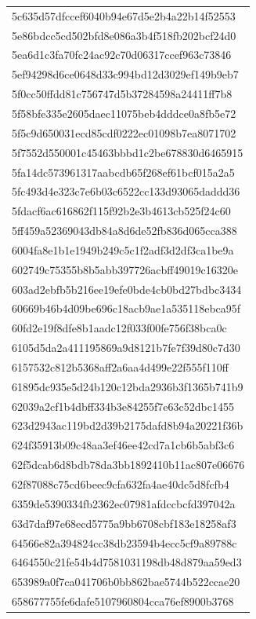 \begin{tabular}{l}
5c635d57dfccef6040b94e67d5e2b4a22b14f52553 \\
5e86bdcc5cd502bfd8e086a3b4f518fb202bcf24d0 \\
5ea6d1c3fa70fc24ac92c70d06317ccef963c73846 \\
5ef94298d6ce0648d33c994bd12d3029ef149b9eb7 \\
5f0cc50ffdd81c756747d5b37284598a24411ff7b8 \\
5f58bfe335e2605daec11075beb4dddce0a8fb5e72 \\
5f5c9d650031ecd85cdf0222ec01098b7ea8071702 \\
5f7552d550001c45463bbbd1c2be678830d6465915 \\
5fa14dc573961317aabcdb65f268ef61bcf015a2a5 \\
5fc493d4e323c7e6b03c6522cc133d93065daddd36 \\
5fdacf6ac616862f115f92b2e3b4613cb525f24c60 \\
5ff459a52369043db84a8d6de52fb836d065cca388 \\
6004fa8e1b1e1949b249c5c1f2adf3d2df3ca1be9a \\
602749c75355b8b5abb397726acbff49019c16320e \\
603ad2ebfb5b216ee19efe0bde4cb0bd27bdbc3434 \\
60669b46b4d09be696c18acb9ae1a535118ebca95f \\
60fd2e19f8dfe8b1aadc12f033f00fe756f38bca0c \\
6105d5da2a411195869a9d8121b7fe7f39d80c7d30 \\
6157532c812b5368aff2a6aa4d499e22f555f110ff \\
61895dc935e5d24b120c12bda2936b3f1365b741b9 \\
62039a2cf1b4dbff334b3e84255f7e63c52dbc1455 \\
623d2943ac119bd2d39b2175dafd8b94a20221f36b \\
624f35913b09c48aa3ef46ee42cd7a1cb6b5abf3c6 \\
62f5dcab6d8bdb78da3bb1892410b11ac807e06676 \\
62f87088c75cd6beec9cfa632fa4ae40dc5d8fcfb4 \\
6359de5390334fb2362ec07981afdccbcfd397042a \\
63d7daf97e68ecd5775a9bb6708cbf183e18258af3 \\
64566e82a394824cc38db23594b4ecc5cf9a89788c \\
6464550c21fe54b4d7581031198db48d879aa59ed3 \\
653989a0f7ca041706b0bb862bae5744b522ccae20 \\
658677755fe6dafe5107960804cca76ef8900b3768 \\

\end{tabular}

